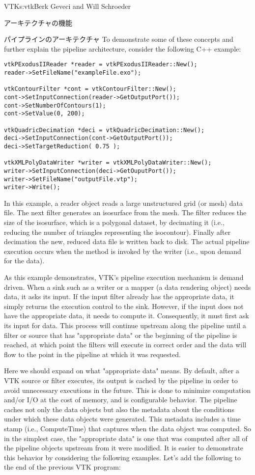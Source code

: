 \begin{aosachapter}{VTK}{s:vtk}{Berk Geveci and Will Schroeder}
\begin{aosasect1}{アーキテクチャの機能}
\begin{aosasect2}{パイプラインのアーキテクチャ}
To demonstrate some of these concepts and further explain the pipeline
architecture, consider the following C++ example:

\begin{verbatim}
vtkPExodusIIReader *reader = vtkPExodusIIReader::New();
reader->SetFileName("exampleFile.exo");

vtkContourFilter *cont = vtkContourFilter::New();
cont->SetInputConnection(reader->GetOutputPort());
cont->SetNumberOfContours(1);
cont->SetValue(0, 200);

vtkQuadricDecimation *deci = vtkQuadricDecimation::New();
deci->SetInputConnection(cont->GetOutputPort());
deci->SetTargetReduction( 0.75 );

vtkXMLPolyDataWriter *writer = vtkXMLPolyDataWriter::New();
writer->SetInputConnection(deci->GetOuputPort());
writer->SetFileName("outputFile.vtp");
writer->Write();
\end{verbatim}

\noindent In this example, a reader object reads a large unstructured grid (or
mesh) data file. The next filter generates an isosurface from the
mesh. The  filter reduces the size of the
isosurface, which is a polygonal dataset, by decimating it (i.e.,
reducing the number of triangles representing the isocontour). Finally
after decimation the new, reduced data file is written back to
disk. The actual pipeline execution occurs when the 
method is invoked by the writer (i.e., upon demand for the data).

As this example demonstrates, VTK's pipeline execution mechanism is
demand driven. When a sink such as a writer or a mapper (a data
rendering object) needs data, it asks its input. If the input filter
already has the appropriate data, it simply returns the execution
control to the sink. However, if the input does not have the
appropriate data, it needs to compute it. Consequently, it must first
ask its input for data. This process will continue upstream along the
pipeline until a filter or source that has "appropriate data" or the
beginning of the pipeline is reached, at which point the filters will
execute in correct order and the data will flow to the point in the
pipeline at which it was requested.

Here we should expand on what "appropriate data" means. By default,
after a VTK source or filter executes, its output is cached by the
pipeline in order to avoid unnecessary executions in the future. This
is done to minimize computation and/or I/O at the cost of memory, and
is configurable behavior. The pipeline caches not only the data
objects but also the metadata about the conditions under which these
data objects were generated. This metadata includes a time stamp
(i.e., ComputeTime) that captures when the data object was
computed. So in the simplest case, the "appropriate data" is one that
was computed after all of the pipeline objects upstream from it were
modified. It is easier to demonstrate this behavior by considering the
following examples. Let's add the following to the end of the previous
VTK program:


\end{aosasect2}
\end{aosasect1}
\end{aosachapter}
